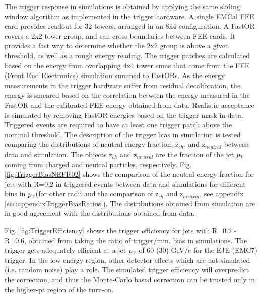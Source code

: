 \documentclass[ALICE]{ALICE_analysis_notes}
\newcommand{\pT}{$p_{\mbox{\tiny T}}$\xspace}
\begin{document}
The trigger response in simulations is obtained by applying the same sliding window algorithm as implemented in the trigger hardware. A single EMCal FEE card provides readout for 32 towers, arranged in an 8x4 configuration. A FastOR covers a 2x2 tower group, and can cross boundaries between FEE cards. It provides a fast way to determine whether the 2x2 group is above a given threshold, as well as a rough energy reading. The trigger patches are calculated based on the energy from overlapping 4x4 tower sums that come from the FEE (Front End Electronics) simulation summed to FastORs. As the energy measurements in the trigger hardware suffer from residual decalibration, the energy is smeared based on the correlation between the energy measured in the FastOR and the calibrated FEE energy obtained from data. Realistic acceptance is simulated by removing FastOR energies based on the trigger mask in data. Triggered events are required to have at least one trigger patch above the nominal threshold. The description of the trigger bias in simulation is tested comparing the distributions of neutral energy fraction, z$_{ch}$, and z$_{neutral}$ between data and simulation. The objects z$_{ch}$ and z$_{neutral}$ are the fraction of the jet \pT coming from charged and neutral particles, respectively. Fig. \ref{fig:TriggerBiasNEFR02} shows the comparison of the neutral energy fraction for jets with R=0.2 in triggered events between data and simulations for different bins in \pT (for other radii and the comparison of z$_{ch}$ and z$_{neutral}$, see appendix \ref{sec:appendixTriggerBiasRatios}). The distributions obtained from simulation are in good agreement with the distributions obtained from data. 

Fig. \ref{fig:TriggerEfficiency} shows the trigger efficiency for jets with R=0.2 - R=0.6, obtained from taking the ratio of trigger/min. bias in simulations. The trigger gets adequately efficient at a jet \pT of 60 (30) GeV/c for the EJE (EMC7) trigger. In the low energy region, other detector effects which are not simulated (i.e. random noise) play a role. The simulated trigger efficiency will overpredict the correction, and thus the Monte-Carlo based correction can be trusted only in the higher-pt region of the turn-on.
\end{document}
